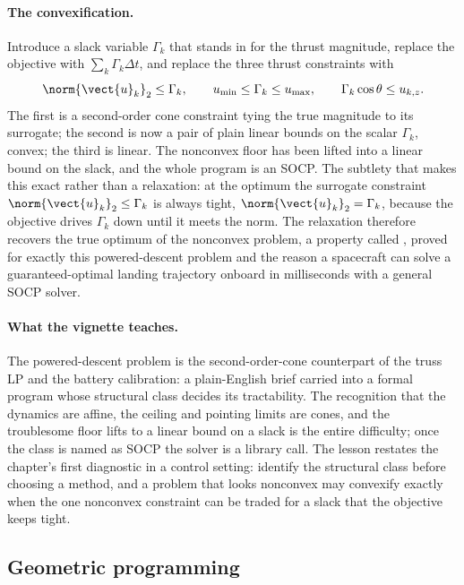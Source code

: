 \paragraph{The convexification.}
Introduce a slack variable $\Gamma_{k}$ that stands in for the thrust
magnitude, replace the objective with $\sum_{k} \Gamma_{k} \Delta t$,
and replace the three thrust constraints with
\[
\norm{\vect{u}_{k}}_{2} \leq \Gamma_{k}, \qquad
u_{\min} \leq \Gamma_{k} \leq u_{\max}, \qquad
\Gamma_{k} \cos\theta \leq u_{k,z}.
\]
The first is a second-order cone constraint tying the true magnitude to
its surrogate; the second is now a pair of plain linear bounds on the
scalar $\Gamma_{k}$, convex; the third is linear. The nonconvex floor
has been lifted into a linear bound on the slack, and the whole program
is an SOCP. The subtlety that makes this exact rather than a relaxation:
at the optimum the surrogate constraint $\norm{\vect{u}_{k}}_{2} \leq
\Gamma_{k}$ is always tight, $\norm{\vect{u}_{k}}_{2} = \Gamma_{k}$,
because the objective drives $\Gamma_{k}$ down until it meets the norm.
The relaxation therefore recovers the true optimum of the nonconvex
problem, a property called , proved
for exactly this powered-descent problem and the reason a spacecraft
can solve a guaranteed-optimal landing trajectory onboard in
milliseconds with a general SOCP solver.

\paragraph{What the vignette teaches.}
The powered-descent problem is the second-order-cone counterpart of the
truss LP and the battery calibration: a plain-English brief carried
into a formal program whose structural class decides its tractability.
The recognition that the dynamics are affine, the ceiling and pointing
limits are cones, and the troublesome floor lifts to a linear bound on
a slack is the entire difficulty; once the class is named as SOCP the
solver is a library call. The lesson restates the chapter's first
diagnostic in a control setting: identify the structural class before
choosing a method, and a problem that looks nonconvex may convexify
exactly when the one nonconvex constraint can be traded for a slack
that the objective keeps tight.

\subsection{Geometric programming}

